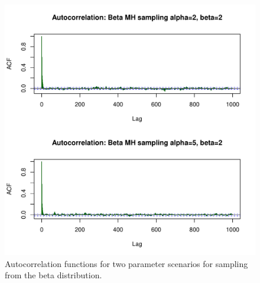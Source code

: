 \documentclass{article}\usepackage[]{graphicx}\usepackage[]{color}
\makeatletter
\def\maxwidth{ %
  \ifdim\Gin@nat@width>\linewidth
    \linewidth
  \else
    \Gin@nat@width
  \fi
}
\newenvironment{knitrout}{}{} %
\makeatother
\begin{document}
\begin{knitrout}
\color{fgcolor}\begin{figure}
\includegraphics[width=\maxwidth]{figure/acf_q3-1} \caption[Autocorrelation functions for two parameter scenarios for sampling from the beta distribution]{Autocorrelation functions for two parameter scenarios for sampling from the beta distribution.}\label{fig:acf_q3}
\end{figure}


\end{knitrout}
\end{document}
